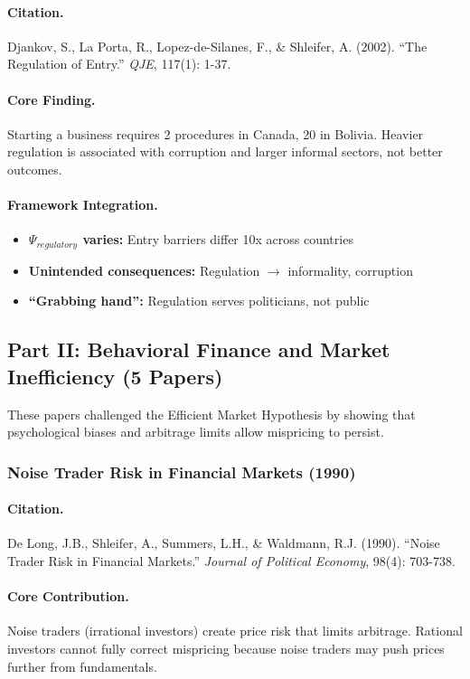 \paragraph{Citation.}
Djankov, S., La Porta, R., Lopez-de-Silanes, F., \& Shleifer, A. (2002).
``The Regulation of Entry.'' \emph{QJE}, 117(1): 1-37.

\paragraph{Core Finding.}
Starting a business requires 2 procedures in Canada, 20 in Bolivia.
Heavier regulation is associated with corruption and larger informal sectors,
not better outcomes.

\paragraph{Framework Integration.}
\begin{itemize}
  \item \textbf{$\Psi_{regulatory}$ varies:} Entry barriers differ 10x across countries
  \item \textbf{Unintended consequences:} Regulation $\to$ informality, corruption
  \item \textbf{``Grabbing hand'':} Regulation serves politicians, not public
\end{itemize}

\subsection{Part II: Behavioral Finance and Market Inefficiency (5 Papers)}

These papers challenged the Efficient Market Hypothesis by showing that
psychological biases and arbitrage limits allow mispricing to persist.

\subsubsection{Noise Trader Risk in Financial Markets (1990)}

\paragraph{Citation.}
De Long, J.B., Shleifer, A., Summers, L.H., \& Waldmann, R.J. (1990).
``Noise Trader Risk in Financial Markets.''
\emph{Journal of Political Economy}, 98(4): 703-738.

\paragraph{Core Contribution.}
Noise traders (irrational investors) create price risk that limits
arbitrage. Rational investors cannot fully correct mispricing because
noise traders may push prices further from fundamentals.

